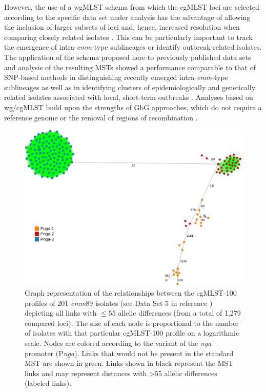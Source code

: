 However, the use of a \ac{wgMLST} schema from which the \ac{cgMLST} loci are selected according to the specific data set under analysis has the advantage of allowing the inclusion of larger subsets of loci and, hence, increased resolution when comparing closely related isolates \cite{maiden_mlst_2013}. This can be particularly important to track the emergence of intra-\textit{emm}-type sublineages or identify outbreak-related isolates. The application of the schema proposed here to previously published data sets and analysis of the resulting \ac{MST}s showed a performance comparable to that of \ac{SNP}-based methods in distinguishing recently emerged intra-\textit{emm}-type sublineages as well as in identifying clusters of epidemiologically and genetically related isolates associated with local, short-term outbreaks \cite{turner_emergence_2015, lynskey_emergence_2019, coelho_genomic_2019}. Analyses based on \ac{wg/cgMLST} build upon the strengths of \ac{GbG} approaches, which do not require a reference genome or the removal of regions of recombination \cite{maiden_mlst_2013, neumann_core_2019, leopold_bacterial_2014}.

\begin{figure}[!ht]
    \centering
    \includegraphics[width=\textwidth]{figures/chapter 4/Figure6.pdf}
    \caption[Graph representation of the relationships between the cgMLST-100 profiles of 201 \textit{emm}89 isolates, depicting all links with $\leq55$ allelic differences (from a total of 1,279 compared loci).]{Graph representation of the relationships between the cgMLST-100 profiles of 201 \textit{emm}89 isolates (see Data Set 5 in reference \cite{friaes_supplemental_2023}) depicting all links with $\leq55$ allelic differences (from a total of 1,279 compared loci). The size of each node is proportional to the number of isolates with that particular cgMLST-100 profile on a logarithmic scale. Nodes are colored according to the variant of the \textit{nga} promoter (P\textit{nga}). Links that would not be present in the standard \ac{MST} are shown in green. Links shown in black represent the \ac{MST} links and may represent distances with >55 allelic differences (labeled links).}
    \label{fig:chap4_figure6}
\end{figure}

